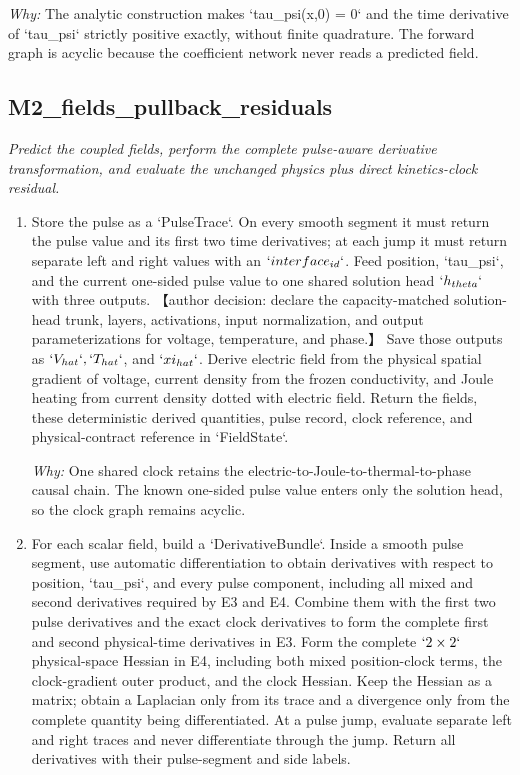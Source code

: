 \documentclass[10pt,a4paper]{article}
\begin{document}
\begin{enumerate}[leftmargin=*,start=2]
\par\emph{Why:} The analytic construction makes `tau\_psi(x,0) = 0` and the time derivative of `tau\_psi` strictly positive exactly, without finite quadrature. The forward graph is acyclic because the coefficient network never reads a predicted field.
\end{enumerate}
\subsection*{M2\_fields\_pullback\_residuals}
\emph{Predict the coupled fields, perform the complete pulse-aware derivative transformation, and evaluate the unchanged physics plus direct kinetics-clock residual.}
\begin{enumerate}[leftmargin=*,start=3]
  \item Store the pulse as a `PulseTrace`. On every smooth segment it must return the pulse value and its first two time derivatives;\allowbreak{} at each jump it must return separate left and right values with an \(`interface_{id}`\). Feed position, `tau\_psi`, and the current one-sided pulse value to one shared solution head \(`h_{theta}`\) with three outputs. 【author decision: declare the capacity-matched solution-head trunk, layers, activations, input normalization, and output parameterizations for voltage, temperature, and phase.】 Save those outputs as \(`V_{hat}`, `T_{hat}`\), and \(`xi_{hat}`\). Derive electric field from the physical spatial gradient of voltage, current density from the frozen conductivity, and Joule heating from current density dotted with electric field. Return the fields, these deterministic derived quantities, pulse record, clock reference, and physical-contract reference in `FieldState`.
\par\emph{Why:} One shared clock retains the electric-to-Joule-to-thermal-to-phase causal chain. The known one-sided pulse value enters only the solution head, so the clock graph remains acyclic.
  \item For each scalar field, build a `DerivativeBundle`. Inside a smooth pulse segment, use automatic differentiation to obtain derivatives with respect to position, `tau\_psi`, and every pulse component, including all mixed and second derivatives required by E3 and E4. Combine them with the first two pulse derivatives and the exact clock derivatives to form the complete first and second physical-time derivatives in E3. Form the complete \(`2\times 2`\) physical-space Hessian in E4, including both mixed position-clock terms, the clock-gradient outer product, and the clock Hessian. Keep the Hessian as a matrix;\allowbreak{} obtain a Laplacian only from its trace and a divergence only from the complete quantity being differentiated. At a pulse jump, evaluate separate left and right traces and never differentiate through the jump. Return all derivatives with their pulse-segment and side labels.

\end{enumerate}
\end{document}
